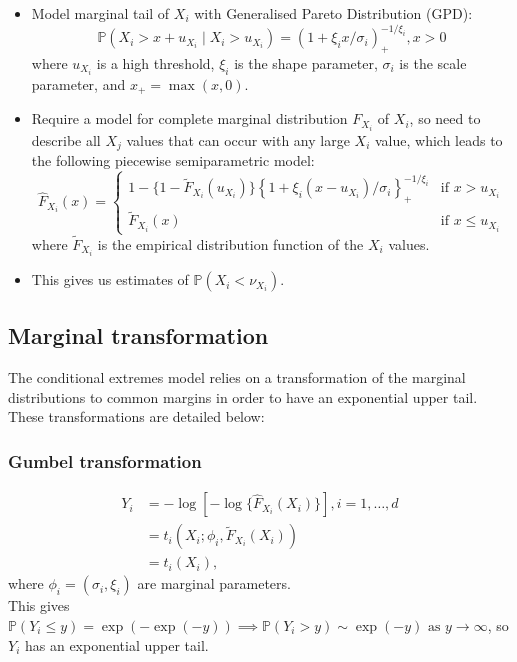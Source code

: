 \documentclass{article}
\numberwithin{equation}{section}
\begin{document}
\begin{itemize}
  \item Model marginal tail of $X_i$ with Generalised Pareto Distribution (GPD):
    \[
      \mathbb{P}(X_i > x + u_{X_i} \mid X_i > u_{X_i}) = {(1 + \xi_{i} x/\sigma_i)}_{+}^{-1/\xi_i}, x > 0 
    \]
    where $u_{X_i}$ is a high threshold, $\xi_i$ is the shape parameter, $\sigma_i$ is the scale parameter, and ${x}_{+} = \max(x, 0)$.
  \item Require a model for complete marginal distribution $F_{X_i}$  of $X_i$, so need to describe all $X_j$ values that can occur with any large $X_i$ value, which leads to the following piecewise semiparametric model:
    \[
      \hat{F}_{X_i}(x) = \begin{cases}
        1 - \{ 1 - \tilde{F}_{X_i}(u_{X_i})\} \left\{1 + \xi_i(x - u_{X_i})/\sigma_i\right\}_{+}^{-1/\xi_i} & \text{if } x > u_{X_i} \\
        \tilde{F}_{X_i}(x) & \text{if } x \le u_{X_i}
      \end{cases}
    \]
    where $\tilde{F}_{X_i}$ is the empirical distribution function of the $X_i$ values. 
  \item This gives us estimates of $\mathbb{P}(X_i < \nu_{X_i})$.
\end{itemize}

\subsection{Marginal transformation}

The conditional extremes model relies on a transformation of the marginal distributions to common margins in order to have an exponential upper tail.
These transformations are detailed below:

\subsubsection{Gumbel transformation}

\begin{align*}
  Y_i &= -\log[-\log\{\hat{F}_{X_i}(X_i)\}], i = 1, \ldots, d \\
      &= t_i(X_i; \phi_i, \tilde{F}_{X_i}(X_i)) \\
      &= t_i(X_i),
\end{align*}
where $\phi_i = (\sigma_i, \xi_i)$ are marginal parameters. \\
This gives $\mathbb{P}(Y_i \le y) = \exp(-\exp(-y)) \implies \mathbb{P}(Y_i > y) \sim \exp(-y) \text{ as } y \rightarrow \infty$, so $Y_i$ has an exponential upper tail. 
\end{document}
